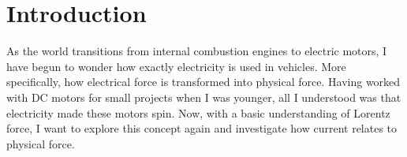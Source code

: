 \section{Introduction}

As the world transitions from internal combustion engines to electric motors, I have begun to wonder how exactly electricity is used in vehicles.
More specifically, how electrical force is transformed into physical force.
Having worked with DC motors for small projects when I was younger, all I understood was that electricity made these motors spin.
Now, with a basic understanding of Lorentz force, I want to explore this concept again and investigate how current relates to physical force.
